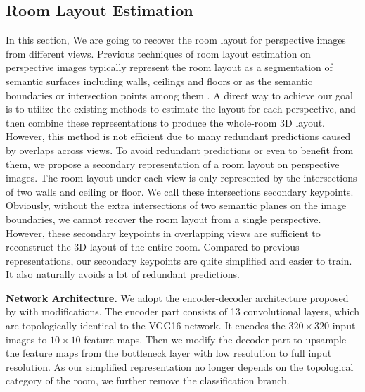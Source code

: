 \subsection{Room Layout Estimation}
\label{sec:layout}
In this section, We are going to recover the room layout for perspective images from different views. Previous techniques of room layout estimation on perspective images typically represent the room layout as a segmentation of semantic surfaces including walls, ceilings and floors \cite{Delay,ours} or as the semantic boundaries or intersection points among them \cite{CFILE}. A direct way to achieve our goal is to utilize the existing methods to estimate the layout for each perspective, and then combine these representations to produce the whole-room 3D layout. However, this method is not efficient due to many redundant predictions caused by overlaps across views. To avoid redundant predictions or even to benefit from them, we propose a secondary representation of a room layout on perspective images. The room layout under each view is only represented by the intersections of two walls and ceiling or floor. We call these intersections secondary keypoints. Obviously, without the extra intersections of two semantic planes on the image boundaries, we cannot recover the room layout from a single perspective. However, these secondary keypoints in overlapping views are sufficient to reconstruct the 3D layout of the entire room. Compared to previous representations, our secondary keypoints are quite simplified and easier to train. It also naturally avoids a lot of redundant predictions. 
 

\noindent\textbf{Network Architecture.} We adopt the encoder-decoder architecture proposed by \cite{roomnet} with modifications. The encoder part consists of 13 convolutional layers, which are topologically identical to the VGG16 network. It encodes the $320\times320$ input images to $10\times10$ feature maps. Then we modify the decoder part to upsample the feature maps from the bottleneck layer with low resolution to full input resolution. As our simplified representation no longer depends on the topological category of the room, we further remove the classification branch. 

